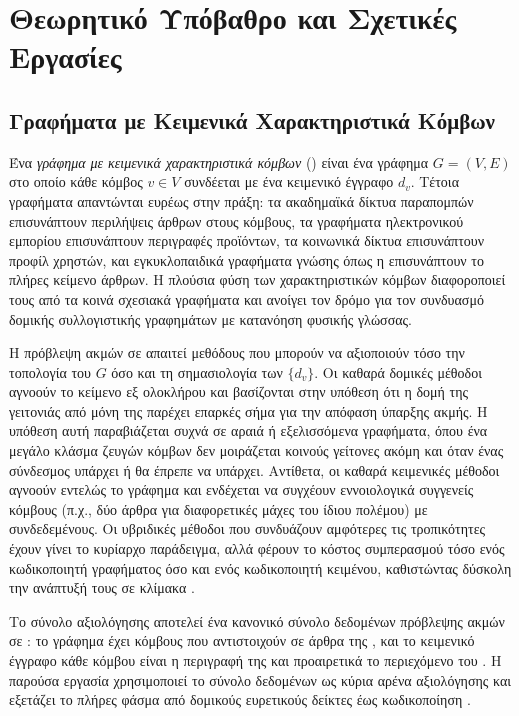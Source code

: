 

\chapter{Θεωρητικό Υπόβαθρο και Σχετικές Εργασίες}
\label{ch:background}


\section{Γραφήματα με Κειμενικά Χαρακτηριστικά Κόμβων}
\label{sec:tag-graphs}

Ένα \textit{γράφημα με κειμενικά χαρακτηριστικά κόμβων} () είναι ένα γράφημα $G = (V, E)$ στο οποίο κάθε κόμβος $v \in V$ συνδέεται με
ένα κειμενικό έγγραφο $d_v$.
Τέτοια γραφήματα απαντώνται ευρέως στην πράξη: τα
ακαδημαϊκά δίκτυα παραπομπών επισυνάπτουν περιλήψεις άρθρων στους κόμβους, τα
γραφήματα ηλεκτρονικού εμπορίου επισυνάπτουν περιγραφές προϊόντων, τα κοινωνικά δίκτυα
επισυνάπτουν προφίλ χρηστών, και εγκυκλοπαιδικά γραφήματα γνώσης όπως η 
επισυνάπτουν το πλήρες κείμενο άρθρων.
Η πλούσια φύση των χαρακτηριστικών κόμβων
διαφοροποιεί τους  από τα κοινά σχεσιακά γραφήματα και ανοίγει τον
δρόμο για τον συνδυασμό δομικής συλλογιστικής γραφημάτων με κατανόηση φυσικής γλώσσας.

Η πρόβλεψη ακμών σε  απαιτεί μεθόδους που μπορούν να αξιοποιούν τόσο την
τοπολογία του $G$ όσο και τη σημασιολογία των $\{d_v\}$.
Οι καθαρά δομικές μέθοδοι
αγνοούν το κείμενο εξ ολοκλήρου και βασίζονται στην υπόθεση ότι η δομή της γειτονιάς
από μόνη της παρέχει επαρκές σήμα για την απόφαση ύπαρξης ακμής.
Η υπόθεση αυτή
παραβιάζεται συχνά σε αραιά ή εξελισσόμενα γραφήματα, όπου ένα μεγάλο κλάσμα
ζευγών κόμβων δεν μοιράζεται κοινούς γείτονες ακόμη και όταν ένας σύνδεσμος υπάρχει
ή θα έπρεπε να υπάρχει.
Αντίθετα, οι καθαρά κειμενικές μέθοδοι αγνοούν εντελώς το
γράφημα και ενδέχεται να συγχέουν εννοιολογικά συγγενείς κόμβους (π.χ., δύο άρθρα για
διαφορετικές μάχες του ίδιου πολέμου) με συνδεδεμένους.
Οι υβριδικές μέθοδοι που
συνδυάζουν αμφότερες τις τροπικότητες έχουν γίνει το κυρίαρχο παράδειγμα, αλλά
φέρουν το κόστος συμπερασμού τόσο ενός κωδικοποιητή γραφήματος όσο και ενός κωδικοποιητή
κειμένου, καθιστώντας δύσκολη την ανάπτυξή τους σε κλίμακα .

Το σύνολο αξιολόγησης  \cite{phan2023link} αποτελεί ένα
κανονικό σύνολο δεδομένων πρόβλεψης ακμών σε : το γράφημα έχει \GraphNodesTotal{} κόμβους
που αντιστοιχούν σε άρθρα της , και το κειμενικό έγγραφο κάθε κόμβου
είναι η περιγραφή της  και προαιρετικά το περιεχόμενο του .
Η παρούσα εργασία χρησιμοποιεί το σύνολο δεδομένων  ως κύρια αρένα
αξιολόγησης και εξετάζει το πλήρες φάσμα από δομικούς ευρετικούς δείκτες έως κωδικοποίηση
.


